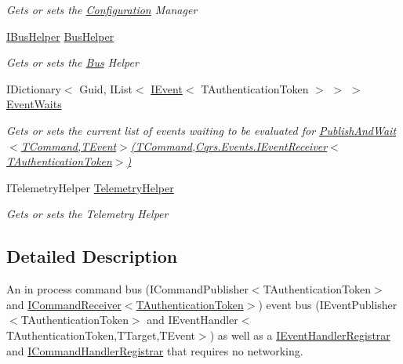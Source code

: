 \begin{DoxyCompactItemize}
\begin{DoxyCompactList}\small\item\em Gets or sets the \hyperlink{namespaceCqrs_1_1Configuration}{Configuration} Manager \end{DoxyCompactList}\item 
\hyperlink{interfaceCqrs_1_1Bus_1_1IBusHelper}{I\+Bus\+Helper} \hyperlink{classCqrs_1_1Bus_1_1InProcessBus_a5dd1cb40277f3e04e743dd8cd63523ff_a5dd1cb40277f3e04e743dd8cd63523ff}{Bus\+Helper}
\begin{DoxyCompactList}\small\item\em Gets or sets the \hyperlink{namespaceCqrs_1_1Bus}{Bus} Helper \end{DoxyCompactList}\item 
I\+Dictionary$<$ Guid, I\+List$<$ \hyperlink{interfaceCqrs_1_1Events_1_1IEvent}{I\+Event}$<$ T\+Authentication\+Token $>$ $>$ $>$ \hyperlink{classCqrs_1_1Bus_1_1InProcessBus_a84de47f021786b0400e0635ec68b4ec1_a84de47f021786b0400e0635ec68b4ec1}{Event\+Waits}
\begin{DoxyCompactList}\small\item\em Gets or sets the current list of events waiting to be evaluated for \hyperlink{classCqrs_1_1Bus_1_1InProcessBus_a38c0684e313f42bfb36b40703db94ccb_a38c0684e313f42bfb36b40703db94ccb}{Publish\+And\+Wait$<$\+T\+Command,\+T\+Event$>$(\+T\+Command,\+Cqrs.\+Events.\+I\+Event\+Receiver$<$\+T\+Authentication\+Token$>$)} \end{DoxyCompactList}\item 
I\+Telemetry\+Helper \hyperlink{classCqrs_1_1Bus_1_1InProcessBus_aeb193bb8b08276db30dd376696726893_aeb193bb8b08276db30dd376696726893}{Telemetry\+Helper}
\begin{DoxyCompactList}\small\item\em Gets or sets the Telemetry Helper \end{DoxyCompactList}\end{DoxyCompactItemize}


\subsection{Detailed Description}
An in process command bus (I\+Command\+Publisher$<$\+T\+Authentication\+Token$>$ and \hyperlink{interfaceCqrs_1_1Commands_1_1ICommandReceiver}{I\+Command\+Receiver$<$\+T\+Authentication\+Token$>$}) event bus (I\+Event\+Publisher$<$\+T\+Authentication\+Token$>$ and I\+Event\+Handler$<$\+T\+Authentication\+Token,\+T\+Target,\+T\+Event$>$) as well as a \hyperlink{interfaceCqrs_1_1Bus_1_1IEventHandlerRegistrar}{I\+Event\+Handler\+Registrar} and \hyperlink{interfaceCqrs_1_1Bus_1_1ICommandHandlerRegistrar}{I\+Command\+Handler\+Registrar} that requires no networking. 


